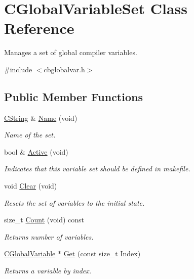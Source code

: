 \hypertarget{classCGlobalVariableSet}{\section{C\-Global\-Variable\-Set Class Reference}
\label{classCGlobalVariableSet}
}


Manages a set of global compiler variables.  




{\ttfamily \#include $<$cbglobalvar.\-h$>$}

\subsection*{Public Member Functions}
\begin{DoxyCompactItemize}
\item 
\hyperlink{classCString}{C\-String} \& \hyperlink{classCGlobalVariableSet_a08cc77bcf9fecf6174d6bbd79802f80b}{Name} (void)
\begin{DoxyCompactList}\small\item\em Name of the set. \end{DoxyCompactList}\item 
bool \& \hyperlink{classCGlobalVariableSet_a55f9272b39b01f1f0ade66d14f49034d}{Active} (void)
\begin{DoxyCompactList}\small\item\em Indicates that this variable set should be defined in makefile. \end{DoxyCompactList}\item 
void \hyperlink{classCGlobalVariableSet_a85890fb1e0b1c7de66ed355d47ca824a}{Clear} (void)
\begin{DoxyCompactList}\small\item\em Resets the set of variables to the initial state. \end{DoxyCompactList}\item 
size\-\_\-t \hyperlink{classCGlobalVariableSet_ad7aa174d238f1824bbcc5839437930ab}{Count} (void) const 
\begin{DoxyCompactList}\small\item\em Returns number of variables. \end{DoxyCompactList}\item 
\hyperlink{classCGlobalVariable}{C\-Global\-Variable} $\ast$ \hyperlink{classCGlobalVariableSet_a54743acad682825eb65daeb7ac011745}{Get} (const size\-\_\-t Index)
\begin{DoxyCompactList}\small\item\em Returns a variable by index. \end{DoxyCompactList}\item 

\end{DoxyCompactItemize}
